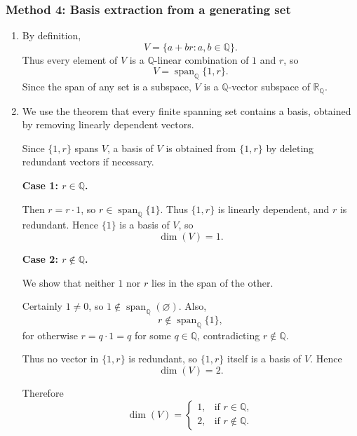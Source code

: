 \documentclass[12pt]{article}
\newcommand{\Q}{\mathbb{Q}}
\newcommand{\R}{\mathbb{R}}
\newcommand{\dimn}{\operatorname{dim}}
\begin{document}
\newpage
\subsubsection{Method 4: Basis extraction from a generating set}
\begin{enumerate}[label=(\alph*)]
\item By definition,
\[
V=\{a+br:a,b\in\Q\}.
\]
Thus every element of \(V\) is a \(\Q\)-linear combination of \(1\) and \(r\), so
\[
V=\operatorname{span}_{\Q}\{1,r\}.
\]
Since the span of any set is a subspace, \(V\) is a \(\Q\)-vector subspace of \(\R_{\Q}\).

\item We use the theorem that every finite spanning set contains a basis, obtained by removing linearly dependent vectors.

Since \(\{1,r\}\) spans \(V\), a basis of \(V\) is obtained from \(\{1,r\}\) by deleting redundant vectors if necessary.

\textbf{Case 1: \(r\in\Q\).}

Then \(r=r\cdot 1\), so \(r\in \operatorname{span}_{\Q}\{1\}\). Thus \(\{1,r\}\) is linearly dependent, and \(r\) is redundant. Hence \(\{1\}\) is a basis of \(V\), so
\[
\dimn(V)=1.
\]

\textbf{Case 2: \(r\notin\Q\).}

We show that neither \(1\) nor \(r\) lies in the span of the other.

Certainly \(1\neq 0\), so \(1\notin \operatorname{span}_{\Q}(\varnothing)\). Also,
\[
r\notin \operatorname{span}_{\Q}\{1\},
\]
for otherwise \(r=q\cdot 1=q\) for some \(q\in\Q\), contradicting \(r\notin\Q\).

Thus no vector in \(\{1,r\}\) is redundant, so \(\{1,r\}\) itself is a basis of \(V\). Hence
\[
\dimn(V)=2.
\]

Therefore
\[
\boxed{
\dimn(V)=
\begin{cases}
1, & \text{if } r\in\Q,\\[1mm]
2, & \text{if } r\notin\Q.
\end{cases}}
\]
\end{enumerate}

\newpage
\end{document}
